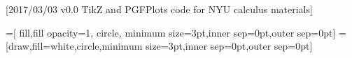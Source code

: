 [2017/03/03 v0.0 TikZ and PGFPlots code for NYU calculus materials]
\usepackage{tikz}

\usetikzlibrary{%
    positioning,
    shapes,
}
=[
    fill,fill opacity=1,
    circle,
    minimum size=3pt,inner sep=0pt,outer sep=0pt]
=[draw,fill=white,circle,minimum size=3pt,inner sep=0pt,outer sep=0pt]

